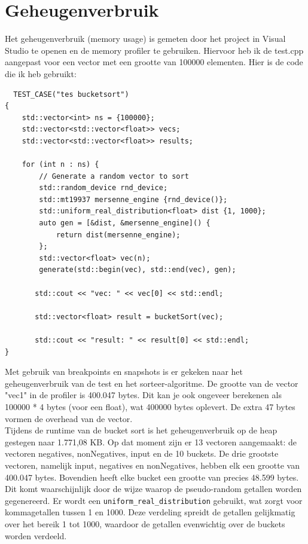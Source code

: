 \documentclass{article}
\begin{document}
\newpage
\section{Geheugenverbruik}
Het geheugenverbruik (memory usage) is gemeten door het project in Visual Studio te openen en de memory profiler te gebruiken. 
Hiervoor heb ik de test.cpp aangepast voor een vector met een grootte van 100000 elementen. Hier is de code die ik heb gebruikt:
\begin{lstlisting}
  TEST_CASE("tes bucketsort")
{
    std::vector<int> ns = {100000};
    std::vector<std::vector<float>> vecs;
    std::vector<std::vector<float>> results;

    for (int n : ns) {
        // Generate a random vector to sort
        std::random_device rnd_device;
        std::mt19937 mersenne_engine {rnd_device()};
        std::uniform_real_distribution<float> dist {1, 1000};
        auto gen = [&dist, &mersenne_engine]() {
            return dist(mersenne_engine);
        };
        std::vector<float> vec(n);
        generate(std::begin(vec), std::end(vec), gen);

       std::cout << "vec: " << vec[0] << std::endl;
       
       std::vector<float> result = bucketSort(vec);
       
       std::cout << "result: " << result[0] << std::endl;
}
\end{lstlisting}
Met gebruik van breakpoints en snapshots is er gekeken naar het geheugenverbruik van de test en het sorteer-algoritme.
De grootte van de vector "vec1" in de profiler is 400.047 bytes. Dit kan je ook ongeveer berekenen als 100000 * 4 bytes (voor een float), wat 400000 bytes oplevert. 
De extra 47 bytes vormen de overhead van de vector. \\

Tijdens de runtime van de bucket sort is het geheugenverbruik op de heap gestegen naar 1.771,08 KB. 
Op dat moment zijn er 13 vectoren aangemaakt: de vectoren negatives, nonNegatives, input en de 10 buckets. 
De drie grootste vectoren, namelijk input, negatives en nonNegatives, hebben elk een grootte van 400.047 bytes. 
Bovendien heeft elke bucket een grootte van precies 48.599 bytes. Dit komt waarschijnlijk door de wijze waarop de pseudo-random getallen worden gegenereerd. 
Er wordt een \texttt{uniform\_real\_distribution} gebruikt, wat zorgt voor kommagetallen tussen 1 en 1000. Deze verdeling spreidt de getallen gelijkmatig over het bereik 1 tot 1000,
waardoor de getallen evenwichtig over de buckets worden verdeeld. \\
\end{document}
